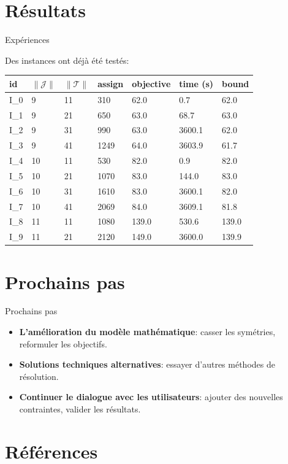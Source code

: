 \documentclass[ignorenonframetext,]{beamer}
\providecommand{\tightlist}{%
  \setlength{\itemsep}{0pt}\setlength{\parskip}{0pt}}
\begin{document}
\section{Résultats}\label{resultats}

\begin{frame}{Expériences}

Des instances ont déjà été testés:

\begin{longtable}[]{@{}lllllll@{}}
\toprule
id & \(\|\mathcal{J}\|\) & \(\|\mathcal{T}\|\) & assign & objective &
time (s) & bound\tabularnewline
\midrule
\endhead
I\_0 & 9 & 11 & 310 & 62.0 & 0.7 & 62.0\tabularnewline
I\_1 & 9 & 21 & 650 & 63.0 & 68.7 & 63.0\tabularnewline
I\_2 & 9 & 31 & 990 & 63.0 & 3600.1 & 62.0\tabularnewline
I\_3 & 9 & 41 & 1249 & 64.0 & 3603.9 & 61.7\tabularnewline
I\_4 & 10 & 11 & 530 & 82.0 & 0.9 & 82.0\tabularnewline
I\_5 & 10 & 21 & 1070 & 83.0 & 144.0 & 83.0\tabularnewline
I\_6 & 10 & 31 & 1610 & 83.0 & 3600.1 & 82.0\tabularnewline
I\_7 & 10 & 41 & 2069 & 84.0 & 3609.1 & 81.8\tabularnewline
I\_8 & 11 & 11 & 1080 & 139.0 & 530.6 & 139.0\tabularnewline
I\_9 & 11 & 21 & 2120 & 149.0 & 3600.0 & 139.9\tabularnewline
\bottomrule
\end{longtable}

\end{frame}

\section{Prochains pas}\label{prochains-pas}

\begin{frame}{Prochains pas}

\begin{itemize}[<+->]
\tightlist
\item
  \textbf{L'amélioration du modèle mathématique}: casser les symétries,
  reformuler les objectifs.
\item
  \textbf{Solutions techniques alternatives}: essayer d'autres méthodes
  de résolution.
\item
  \textbf{Continuer le dialogue avec les utilisateurs}: ajouter des
  nouvelles contraintes, valider les résultats.
\end{itemize}

\end{frame}

\section{Références}\label{references}
\end{document}
